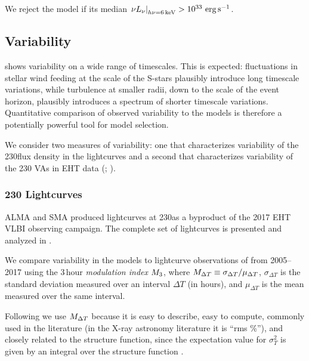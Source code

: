 We reject the model if its median $\left.\nu L_\nu\right|_{h\nu=6\,\mathrm{keV}} > 10^{33}\,\,\mathrm{erg}\,\mathrm{s}^{-1}$.

\subsection{Variability}

\sgra shows variability on a wide range of timescales.
This is expected: fluctuations in stellar wind feeding at the scale of the S-stars plausibly introduce long timescale variations, while turbulence at smaller radii, down to the scale of the event horizon, plausibly introduces a spectrum of shorter timescale variations.
Quantitative comparison of observed variability to the models is therefore a potentially powerful tool for model selection.

We consider two measures of variability: one that characterizes variability of the 230\GHz flux density in the lightcurves \citep{Wielgus2022} and a second that characterizes variability of the 230 \GHz VAs in EHT data (; \citealt{NoiseModeling}).

\subsubsection{230 \GHz Lightcurves}

ALMA and SMA produced \sgra lightcurves at 230\GHz as a byproduct of the 2017 EHT VLBI observing campaign.
The complete set of lightcurves is presented and analyzed in \cite{Wielgus2022}.

We compare variability in the models to lightcurve observations of \sgra from 2005--2017 using the 3\,hour {\em modulation index} $M_{3}$, where $M_{\Delta T} \equiv \sigma_{\Delta T}/\mu_{\Delta T}$, $\sigma_{\Delta T}$ is the standard deviation measured over an interval $\Delta T$ (in hours), and $\mu_{\Delta T}$ is the mean measured over the same interval.

Following \citet{2015ApJ...812..103C} we use $M_{\Delta T}$ because it is easy to describe, easy to compute, commonly used in the literature (in the X-ray astronomy literature it is ``rms \%''), and closely related to the structure function, since the expectation value for $\sigma_T^2$ is given by an integral over the structure function \citep[see][]{Lee_2022}.

